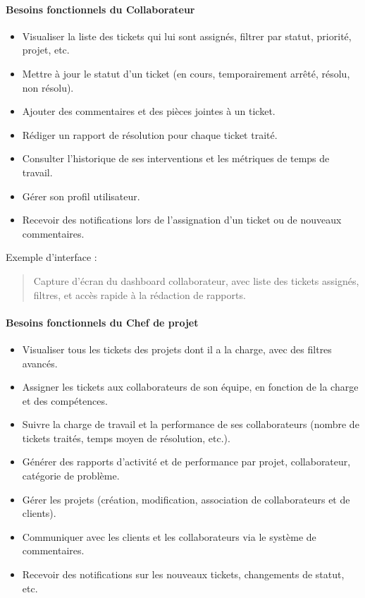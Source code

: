 \paragraph{Besoins fonctionnels du Collaborateur}
\label{sec:besoins-fonctionnels-collaborateur}
\begin{itemize}
    \item Visualiser la liste des tickets qui lui sont assignés, filtrer par statut, priorité, projet, etc.
    \item Mettre à jour le statut d'un ticket (en cours, temporairement arrêté, résolu, non résolu).
    \item Ajouter des commentaires et des pièces jointes à un ticket.
    \item Rédiger un rapport de résolution pour chaque ticket traité.
    \item Consulter l'historique de ses interventions et les métriques de temps de travail.
    \item Gérer son profil utilisateur.
    \item Recevoir des notifications lors de l'assignation d'un ticket ou de nouveaux commentaires.
\end{itemize}

Exemple d'interface :
\begin{quote}
    Capture d'écran du dashboard collaborateur, avec liste des tickets assignés, filtres, et accès rapide à la rédaction de rapports.
\end{quote}

\paragraph{Besoins fonctionnels du Chef de projet}
\label{sec:besoins-fonctionnels-chef-projet}
\begin{itemize}
    \item Visualiser tous les tickets des projets dont il a la charge, avec des filtres avancés.
    \item Assigner les tickets aux collaborateurs de son équipe, en fonction de la charge et des compétences.
    \item Suivre la charge de travail et la performance de ses collaborateurs (nombre de tickets traités, temps moyen de résolution, etc.).
    \item Générer des rapports d'activité et de performance par projet, collaborateur, catégorie de problème.
    \item Gérer les projets (création, modification, association de collaborateurs et de clients).
    \item Communiquer avec les clients et les collaborateurs via le système de commentaires.
    \item Recevoir des notifications sur les nouveaux tickets, changements de statut, etc.
\end{itemize}


